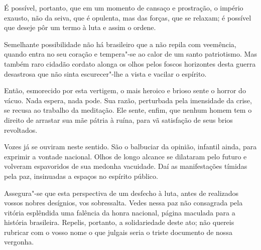\begin{linenumbers}
É possível, portanto, que em um momento de cansaço e prostração, o
império exausto, não da seiva, que é opulenta, mas das forças, que se
relaxam; é possível que deseje pôr um termo à luta e assim o ordene. 

Semelhante possibilidade não há brasileiro que a não repila com
veemência, quando entra no seu coração e tempera"-se ao calor de um
santo patriotismo. Mas também raro cidadão cordato alonga os olhos
pelos foscos horizontes desta guerra desastrosa que não sinta
escurecer"-lhe a vista e vacilar o espírito. 

Então, esmorecido por esta vertigem, o mais heroico e brioso sente o
horror do vácuo. Nada espera, nada pode. Sua razão, perturbada pela
imensidade da crise, se recusa ao trabalho da meditação. Ele sente,
enfim, que nenhum homem tem o direito de arrastar sua mãe pátria à
ruína, para vã satisfação de seus brios revoltados.

Vozes já se ouviram neste sentido. São o balbuciar da opinião, infantil
ainda, para exprimir a vontade nacional. Olhos de longo alcance se
dilataram pelo futuro e volveram espavoridos de sua medonha vacuidade.
Daí as manifestações tímidas pela paz, insinuadas a espaços no espírito público. 

Assegura"-se que esta perspectiva de um desfecho à luta, antes de
realizados vossos nobres desígnios, vos sobressalta. Vedes nessa paz
não consagrada pela vitória esplêndida uma falência da honra nacional,
página maculada para a história brasileira. Repelis, portanto, a
solidariedade deste ato; não quereis rubricar com o vosso nome o que
julgais seria o triste documento de nossa vergonha. 

\end{linenumbers}

\sectionitem

